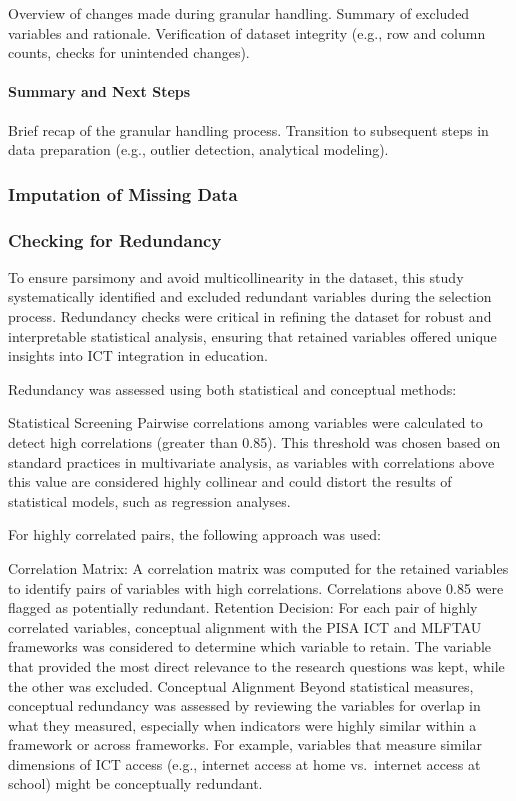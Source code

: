 \documentclass[
]{article}
\begin{document}
Overview of changes made during granular handling. Summary of excluded
variables and rationale. Verification of dataset integrity (e.g., row
and column counts, checks for unintended changes).

\hypertarget{summary-and-next-steps-2}{%
\paragraph{Summary and Next Steps}\label{summary-and-next-steps-2}}

Brief recap of the granular handling process. Transition to subsequent
steps in data preparation (e.g., outlier detection, analytical
modeling).

\hypertarget{imputation-of-missing-data}{%
\subsubsection{Imputation of Missing
Data}\label{imputation-of-missing-data}}

\hypertarget{checking-for-redundancy}{%
\subsubsection{Checking for Redundancy}\label{checking-for-redundancy}}

To ensure parsimony and avoid multicollinearity in the dataset, this
study systematically identified and excluded redundant variables during
the selection process. Redundancy checks were critical in refining the
dataset for robust and interpretable statistical analysis, ensuring that
retained variables offered unique insights into ICT integration in
education.

Redundancy was assessed using both statistical and conceptual methods:

Statistical Screening Pairwise correlations among variables were
calculated to detect high correlations (greater than 0.85). This
threshold was chosen based on standard practices in multivariate
analysis, as variables with correlations above this value are considered
highly collinear and could distort the results of statistical models,
such as regression analyses.

For highly correlated pairs, the following approach was used:

Correlation Matrix: A correlation matrix was computed for the retained
variables to identify pairs of variables with high correlations.
Correlations above 0.85 were flagged as potentially redundant. Retention
Decision: For each pair of highly correlated variables, conceptual
alignment with the PISA ICT and MLFTAU frameworks was considered to
determine which variable to retain. The variable that provided the most
direct relevance to the research questions was kept, while the other was
excluded. Conceptual Alignment Beyond statistical measures, conceptual
redundancy was assessed by reviewing the variables for overlap in what
they measured, especially when indicators were highly similar within a
framework or across frameworks. For example, variables that measure
similar dimensions of ICT access (e.g., internet access at home
vs.~internet access at school) might be conceptually redundant.
\end{document}
